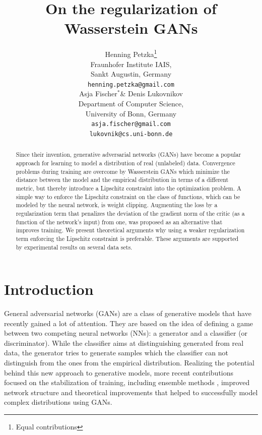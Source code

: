 \documentclass{article} %
\title{On the regularization of Wasserstein GANs}
\author{Henning Petzka\thanks{Equal contributions} %
\\
Fraunhofer Institute IAIS, \\Sankt Augustin, Germany\\
\texttt{henning.petzka@gmail.com}
 \\
\And
Asja Fischer$^*$\& Denis Lukovnikov \\
Department of Computer Science,\\
University of Bonn, Germany \\
\texttt{asja.fischer@gmail.com} \\
\texttt{lukovnik@cs.uni-bonn.de}\\
}
\begin{document}
\maketitle


\begin{abstract}Since their invention, generative adversarial networks (GANs) have become a popular approach for learning to model a distribution of real (unlabeled) data. Convergence problems during training are overcome by Wasserstein GANs which minimize the distance between the model and the empirical distribution in terms of a different metric, but thereby introduce a Lipschitz constraint into the optimization problem. A simple way to enforce the Lipschitz constraint on the class of functions, which can be modeled by the neural network, is weight clipping. Augmenting the loss by a regularization term that penalizes the deviation of the gradient norm of the critic (as a function of the network's input) from one, was proposed as an alternative that improves training. We present theoretical arguments why using a weaker regularization term enforcing the Lipschitz constraint is preferable. These arguments are supported by experimental results on several data sets.
\end{abstract} 



\section{Introduction}

General adversarial networks (GANs) \citep{GAN} are a class of generative models that have recently gained a lot of attention. They are based on the idea of defining a game between two competing neural networks (NNs): a generator and a classifier (or discriminator). While the classifier aims at distinguishing generated from real data, the generator tries to generate samples which the classifier can not distinguish from the ones from the empirical distribution.  %
Realizing the potential behind this new approach to generative models, more recent contributions focused on the stabilization of training, including ensemble methods \citep{adaGAN}, improved network structure \citep{UnsupervizedRepresentationLearningWithDeepConvolutionalGenerativeAdversarialNetworks,iGAN} and theoretical improvements \citep{fGAN,iGAN,ArjovskyGANs,infoGAN} that helped to successfully model complex distributions using GANs.
\end{document}
